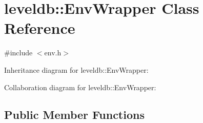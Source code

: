\hypertarget{classleveldb_1_1_env_wrapper}{}\section{leveldb\+:\+:Env\+Wrapper Class Reference}
\label{classleveldb_1_1_env_wrapper}


{\ttfamily \#include $<$env.\+h$>$}



Inheritance diagram for leveldb\+:\+:Env\+Wrapper\+:


Collaboration diagram for leveldb\+:\+:Env\+Wrapper\+:
\subsection*{Public Member Functions}
